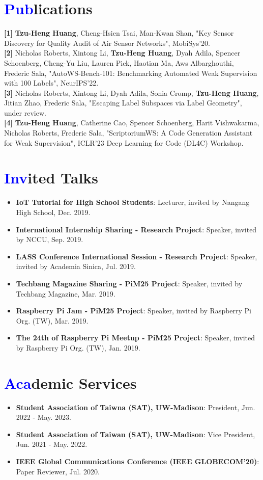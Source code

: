 \documentclass[letterpaper,11pt]{article}
\newcommand{\resumeItem}[2]{
  \item\small{
    \textbf{#1}{: #2 \vspace{-2pt}}
  }
}
\newcommand{\resumeSubItem}[2]{\resumeItem{#1}{#2}\vspace{-5pt}}
\newcommand{\resumeSubHeadingListStart}{\begin{itemize}[leftmargin=*]}
\newcommand{\resumeSubHeadingListEnd}{\end{itemize}}
\begin{document}
\section{\textbf{\textcolor{blue}{Pub}lications}}
{\textbf{[1]} \textbf{Tzu-Heng Huang}, Cheng-Hsien Tsai, Man-Kwan Shan, "Key Sensor Discovery for Quality Audit of Air Sensor Networks", MobiSys'20.} \\
{\textbf{[2]} Nicholas Roberts, Xintong Li, \textbf{Tzu-Heng Huang}, Dyah Adila, Spencer Schoenberg, Cheng-Yu Liu, Lauren Pick, Haotian Ma, Aws Albarghouthi, Frederic Sala, "AutoWS-Bench-101: Benchmarking Automated Weak Supervision with 100 Labels", NeurIPS'22.} \\
{\textbf{[3]} Nicholas Roberts, Xintong Li, Dyah Adila, Sonia Cromp, \textbf{Tzu-Heng Huang}, Jitian Zhao, Frederic Sala, "Escaping Label Subspaces via Label Geometry", under review.} \\
{\textbf{[4]} \textbf{Tzu-Heng Huang}, Catherine Cao, Spencer Schoenberg, Harit Vishwakarma, Nicholas Roberts, Frederic Sala, "ScriptoriumWS: A Code Generation Assistant for Weak Supervision", ICLR'23 Deep Learning for Code (DL4C) Workshop.}

\section{\textbf{\textcolor{blue}{Inv}ited Talks}}
  \resumeSubHeadingListStart
    \resumeSubItem{IoT Tutorial for High School Students}{Lecturer, invited by Nangang High School, Dec. 2019.}
    \resumeSubItem{International Internship Sharing - Research Project}{Speaker, invited by NCCU, Sep. 2019.}
    \resumeSubItem{LASS Conference International Session - Research Project}{Speaker, invited by Academia Sinica, Jul. 2019.}
    \resumeSubItem{Techbang Magazine Sharing - PiM25 Project}{Speaker, invited by Techbang Magazine, Mar. 2019.}
    \resumeSubItem{Raspberry Pi Jam - PiM25 Project}{Speaker, invited by Raspberry Pi Org. (TW), Mar. 2019.}
    \resumeSubItem{The 24th of Raspberry Pi Meetup - PiM25 Project}{Speaker, invited by Raspberry Pi Org. (TW), Jan. 2019.}
  \resumeSubHeadingListEnd

\section{\textbf{\textcolor{blue}{Aca}demic Services}}
  \resumeSubHeadingListStart
    \resumeSubItem{Student Association of Taiwna (SAT), UW-Madison}{President, Jun. 2022 - May. 2023.}
    \resumeSubItem{Student Association of Taiwan (SAT), UW-Madison}{Vice President, Jun. 2021 - May. 2022.}
    \resumeSubItem{IEEE Global Communications Conference (IEEE GLOBECOM'20)}{Paper Reviewer, Jul. 2020.}
  \resumeSubHeadingListEnd
\end{document}
